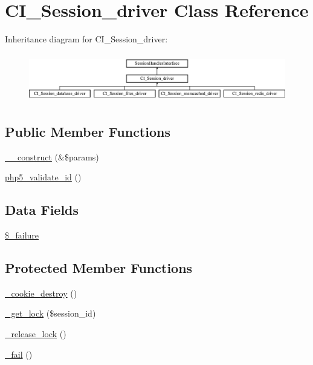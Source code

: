 \hypertarget{class_c_i___session__driver}{}\section{C\+I\+\_\+\+Session\+\_\+driver Class Reference}
\label{class_c_i___session__driver}
Inheritance diagram for C\+I\+\_\+\+Session\+\_\+driver\+:\begin{figure}[H]
\begin{center}
\leavevmode
\includegraphics[height=2.121212cm]{class_c_i___session__driver}
\end{center}
\end{figure}
\subsection*{Public Member Functions}
\begin{DoxyCompactItemize}
\item 
\mbox{\hyperlink{class_c_i___session__driver_ac1669c73d53d6f16cf5459a1e84d39c8}{\+\_\+\+\_\+construct}} (\&\$params)
\item 
\mbox{\hyperlink{class_c_i___session__driver_ae2d4c0f64a46de5c8f8db759478f3a5f}{php5\+\_\+validate\+\_\+id}} ()
\end{DoxyCompactItemize}
\subsection*{Data Fields}
\begin{DoxyCompactItemize}
\item 
\mbox{\hyperlink{class_c_i___session__driver_af597a603db9347ef534b97834ed272a8}{\$\+\_\+failure}}
\end{DoxyCompactItemize}
\subsection*{Protected Member Functions}
\begin{DoxyCompactItemize}
\item 
\mbox{\hyperlink{class_c_i___session__driver_a36771b622e8a8928c1c931ac56c12434}{\+\_\+cookie\+\_\+destroy}} ()
\item 
\mbox{\hyperlink{class_c_i___session__driver_a2c49c8e23be3e2aca96a9d20de18ffc2}{\+\_\+get\+\_\+lock}} (\$session\+\_\+id)
\item 
\mbox{\hyperlink{class_c_i___session__driver_a0265e356e6cf1eaba229663c1664c37d}{\+\_\+release\+\_\+lock}} ()
\item 
\mbox{\hyperlink{class_c_i___session__driver_a1b1bf5bb9cba50e84f985c30f6b64773}{\+\_\+fail}} ()
\end{DoxyCompactItemize}
